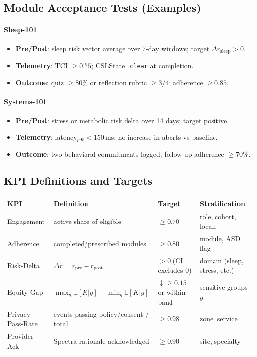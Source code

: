 \documentclass[11pt]{article}
\theoremstyle{plain}
\begin{document}
\subsection{Module Acceptance Tests (Examples)}
\paragraph{Sleep-101}
\begin{itemize}
  \item \textbf{Pre/Post}: sleep risk vector average over 7-day windows; target \(\Delta r_{\mathrm{sleep}}>0\).
  \item \textbf{Telemetry}: TCI \(\ge 0.75\); CSLState=\texttt{clear} at completion.
  \item \textbf{Outcome}: quiz \(\ge 80\%\) or reflection rubric \(\ge 3/4\); adherence \(\ge 0.85\).
\end{itemize}
\paragraph{Systems-101}
\begin{itemize}
  \item \textbf{Pre/Post}: stress or metabolic risk delta over 14 days; target positive.
  \item \textbf{Telemetry}: latency\(_{p95}<\)150\,ms; no increase in aborts vs baseline.
  \item \textbf{Outcome}: two behavioral commitments logged; follow-up adherence \(\ge 70\%\).
\end{itemize}

\subsection{KPI Definitions and Targets}
\begin{center}
\begin{tabular}{l l l l}
\hline
\textbf{KPI} & \textbf{Definition} & \textbf{Target} & \textbf{Stratification} \\
\hline
Engagement & active share of eligible & $\ge 0.70$ & role, cohort, locale \\
Adherence & completed/prescribed modules & $\ge 0.80$ & module, ASD flag \\
Risk-Delta & $\Delta r=\overline{r}_{\mathrm{pre}}-\overline{r}_{\mathrm{post}}$ & $>0$ (CI excludes 0) & domain (sleep, stress, etc.) \\
Equity Gap & $\max_g \mathbb{E}[K|g]-\min_g \mathbb{E}[K|g]$ & $\downarrow \ge 0.15$ or within band & sensitive groups $g$ \\
Privacy Pass-Rate & events passing policy/consent / total & $\ge 0.98$ & zone, service \\
Provider Ack & Spectra rationale acknowledged & $\ge 0.90$ & site, specialty \\
\hline
\end{tabular}
\end{center}
\end{document}
